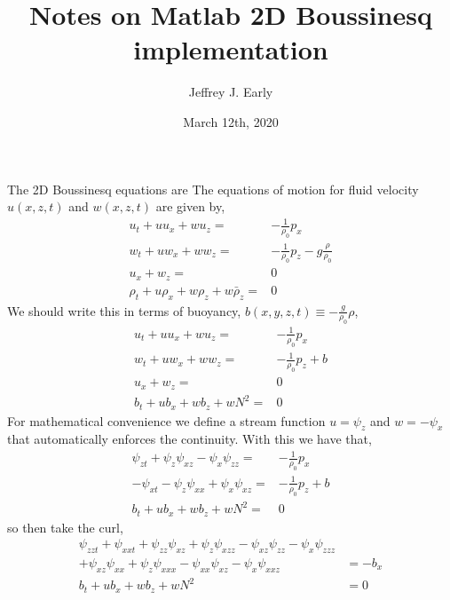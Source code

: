 \documentclass[11pt]{article}
\title{Notes on Matlab 2D Boussinesq implementation}
\author{Jeffrey J. Early}
\date{March 12th, 2020}                                           %
\begin{document}
\maketitle
The 2D Boussinesq equations are
The equations of motion for fluid velocity $u(x,z,t)$ and $w(x,z,t)$ are given by,
\begin{subequations}{}
\begin{align}
\label{x-momentum-bq}
u_t +u u_x + w u_z=& - \frac{1}{\rho_0} p_x \\ \label {z-momentum-bq}
w_t +u w_x + w w_z =& - \frac{1}{\rho_0} p_z - g \frac{\rho}{\rho_0} \\ \label{continuity-bq}
u_x + w_z =& 0 \\ \label{thermodynamic-bq}
\rho_t + u \rho_x + w \rho_z + w \bar{\rho}_z =& 0
\end{align}
\end{subequations}
We should write this in terms of buoyancy, $b(x,y,z,t) \equiv -\frac{g}{\rho_0} \rho$,
\begin{subequations}{}
\begin{align}
u_t +u u_x + w u_z=& - \frac{1}{\rho_0} p_x \\
w_t +u w_x + w w_z =& - \frac{1}{\rho_0} p_z + b \\
u_x + w_z =& 0 \\ 
b_t + u b_x + w b_z + w N^2 =& 0
\end{align}
\end{subequations}
For mathematical convenience we define a stream function $u=\psi_z$ and $w=-\psi_x$ that automatically enforces the continuity. With this we have that,
\begin{subequations}{}
\begin{align}
\psi_{zt} +\psi_z \psi_{xz} -\psi_x \psi_{zz}=& - \frac{1}{\rho_0} p_x \\
-\psi_{xt} -\psi_z \psi_{xx} + \psi_x \psi_{xz} =& - \frac{1}{\rho_0} p_z + b \\
b_t + u b_x + w b_z + w N^2 =& 0
\end{align}
\end{subequations}
so then take the curl,
\begin{subequations}{}
\begin{align} \nonumber
\psi_{zzt} + \psi_{xxt} +\psi_{zz} \psi_{xz} + \psi_z \psi_{xzz}  -\psi_{xz} \psi_{zz}-\psi_x \psi_{zzz} & \\
+ \psi_{xz} \psi_{xx}+\psi_z \psi_{xxx}-\psi_{xx} \psi_{xz} - \psi_x \psi_{xxz}&= - b_x \\
b_t + u b_x + w b_z + w N^2 &= 0
\end{align}
\end{subequations}
\end{document}
